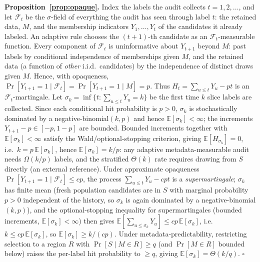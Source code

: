 \documentclass[conference]{IEEEtran}
\begin{document}
\medskip
\noindent\textbf{Proposition~\ref{prop:opaque}.} Index the labels the audit collects $t=1,2,\dots$, and let
$\mathcal F_{t}$ be the $\sigma$-field of everything the audit has seen through label $t$: the retained data,
$M$, and the membership indicators $Y_1,\dots,Y_t$ of the candidates it already labeled. An adaptive rule
chooses the $(t{+}1)$-th candidate as an $\mathcal F_t$-measurable function. Every component of $\mathcal F_t$ is
uninformative about $Y_{t+1}$ beyond $M$: past labels by conditional independence of memberships given $M$, and the
retained data (a function of \emph{other} i.i.d.\ candidates) by the independence of distinct draws given $M$.
Hence, with opaqueness,
$\Pr[Y_{t+1}{=}1\mid\mathcal F_t]=\Pr[Y_{t+1}{=}1\mid M]=p$. Thus $H_t=\sum_{u\le t}Y_u-pt$ is an
$\mathcal F_t$-martingale. Let $\sigma_k=\inf\{t:\sum_{u\le t}Y_u=k\}$ be the first time $k$ slice labels are
collected. Since each conditional hit probability is $p>0$, $\sigma_k$ is stochastically dominated by a
negative-binomial$(k,p)$ and hence $\mathbb E[\sigma_k]<\infty$; the increments $Y_{t+1}-p\in[-p,1-p]$ are
bounded. Bounded increments together with $\mathbb E[\sigma_k]<\infty$ satisfy the Wald/optional-stopping
criterion, giving $\mathbb E[H_{\sigma_k}]=0$, i.e.\ $k=p\,\mathbb E[\sigma_k]$, hence $\mathbb E[\sigma_k]=k/p$:
any adaptive metadata-measurable audit needs $\Omega(k/p)$ labels, and the stratified $\Theta(k)$ rate requires
drawing from $S$ directly (an external reference). Under approximate opaqueness $\Pr[Y_{t+1}{=}1\mid\mathcal
F_t]\le cp$, the process $\sum_{u\le t}Y_u-cpt$ is a \emph{supermartingale}; $\sigma_k$ has finite mean (fresh
population candidates are in $S$ with marginal probability $p>0$ independent of the history, so $\sigma_k$ is
again dominated by a negative-binomial$(k,p)$), and the optional-stopping inequality for supermartingales
(bounded increments, $\mathbb E[\sigma_k]<\infty$) then gives
$\mathbb E[\sum_{u\le\sigma_k}Y_u]\le cp\,\mathbb E[\sigma_k]$, i.e.\ $k\le cp\,\mathbb E[\sigma_k]$, so
$\mathbb E[\sigma_k]\ge k/(cp)$. Under metadata-predictability, restricting
selection to a region $R$ with $\Pr[S\mid M{\in}R]\ge q$ (and $\Pr[M\in R]$ bounded below) raises the per-label
hit probability to $\ge q$, giving $\mathbb E[\sigma_k]=\Theta(k/q)$. \hfill$\square$
\end{document}
